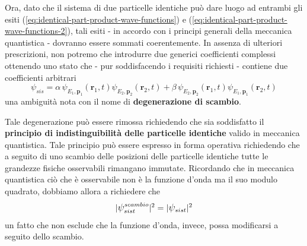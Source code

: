 Ora, dato che il sistema di due particelle identiche può dare luogo
ad entrambi gli esiti (\ref{eq:identical-part-product-wave-functions}) e (\ref{eq:identical-part-product-wave-functions-2}),
tali esiti - in accordo con
i principi generali della meccanica quantistica - dovranno essere
sommati coerentemente.
In assenza di ulteriori prescrizioni, non potremo
che introdurre due generici coefficienti complessi ottenendo uno stato
che - pur soddisfacendo i requisiti richiesti - contiene due
coefficienti arbitrari
\[
    \psi_{sis} = \alpha \, \psi_{E_{1},\bm{p}_{1}}(\bm{r}_{1},t) \psi_{E_{2},\bm{p}_{2}}(\bm{r}_{2},t) +
    \beta \, \psi_{E_{2},\bm{p}_{2}}(\bm{r}_{1},t) \psi_{E_{1},\bm{p}_{1}}(\bm{r}_{2},t)
\]
una ambiguità nota con il nome di \textbf{degenerazione di scambio}.
\bigskip

Tale degenerazione può essere rimossa richiedendo che sia soddisfatto il \textbf{principio di indistinguibilità delle particelle
identiche} valido in meccanica quantistica.
Tale principio può essere espresso in forma operativa richiedendo che a seguito di uno scambio delle posizioni delle particelle identiche tutte le grandezze fisiche osservabili rimangano immutate.
Ricordando che in meccanica quantistica ciò che è osservabile non è la funzione d’onda ma il suo modulo quadrato, dobbiamo allora a richiedere che
\begin{equation}
    |\mathlarger{\psi}_{sist}^{scambio}|^2 = |\mathlarger{\psi}_{sist}|^2
    \label{eq:indistinguishable-particles-principle}
\end{equation}
un fatto che non esclude che la funzione d’onda, invece, possa modificarsi a seguito dello scambio.
\bigskip

